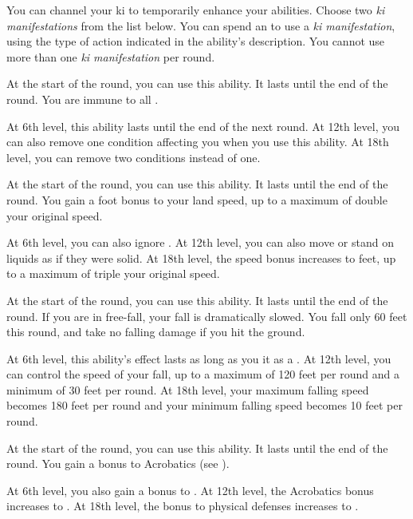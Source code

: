         You can channel your ki to temporarily enhance your abilities.
        Choose two \textit{ki manifestations} from the list below.
        You can spend an  to use a \textit{ki manifestation}, using the type of action indicated in the ability's description.
        You cannot use more than one \textit{ki manifestation} per round.
        {
            At the start of the round, you can use this ability.
            It lasts until the end of the round.
            You are immune to all .
            \par At 6th level, this ability lasts until the end of the next round.
            At 12th level, you can also remove one condition affecting you when you use this ability.
            At 18th level, you can remove two conditions instead of one.

            At the start of the round, you can use this ability.
            It lasts until the end of the round.
            You gain a  foot bonus to your land speed, up to a maximum of double your original speed.
            \par At 6th level, you can also ignore .
            At 12th level, you can also move or stand on liquids as if they were solid.
            At 18th level, the speed bonus increases to  feet, up to a maximum of triple your original speed.

            At the start of the round, you can use this ability.
            It lasts until the end of the round.
            If you are in free-fall, your fall is dramatically slowed.
            You fall only 60 feet this round, and take no falling damage if you hit the ground.
            \par At 6th level, this ability's effect lasts as long as you  it as a .
            At 12th level, you can control the speed of your fall, up to a maximum of 120 feet per round and a minimum of 30 feet per round.
            At 18th level, your maximum falling speed becomes 180 feet per round and your minimum falling speed becomes 10 feet per round.

            At the start of the round, you can use this ability.
            It lasts until the end of the round.
            You gain a  bonus to Acrobatics (see ).
            \par At 6th level, you also gain a  bonus to .
            At 12th level, the Acrobatics bonus increases to .
            At 18th level, the bonus to physical defenses increases to .

}
